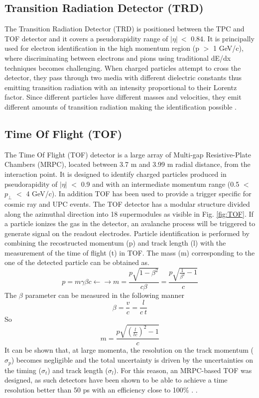 \documentclass[12pt,a4paper]{book}
\begin{document}
	
	\subsection{Transition Radiation Detector (TRD)}
	The Transition Radiation Detector (TRD) is positioned between the TPC and TOF detector and it covers a pseudorapidity range of $|\eta|\ <$ 0.84. It is principally used for electron identification in the high momentum region (p $>$ 1 GeV/c), where discriminating between electrons and pions using traditional dE/dx techniques becomes challenging. When charged particles attempt to cross the detector, they pass through two media with different dielectric constants thus emitting transition radiation with an intensity proportional to their Lorentz factor. Since different particles have different masses and velocities, they emit different amounts of transition radiation making the identification possible
	\cite{Padhan:2924203} \cite{amsdottorato9036}.
	
	
	\subsection{Time Of Flight (TOF)}
	The Time Of Flight (TOF) detector is a large array of Multi-gap Resistive-Plate Chambers (MRPC), located between 3.7 m and 3.99 m radial distance, from the interaction point. It is designed to identify charged particles produced in pseudorapidity of $|\eta|$ $<$ 0.9 and with an intermediate momentum range (0.5 $<$ $p_\perp$ $<$ 4 GeV/c). In addition TOF has been used to provide a trigger specific for cosmic ray and UPC events. The TOF detector has a modular structure divided along the azimuthal direction into 18 supermodules as visible in Fig. \ref{fig:TOF}. If a particle ionizes the gas in the detector, an avalanche process will be triggered to generate signal on the readout electrodes. Particle identification is performed by combining the recostructed momentum (p) and track length (l) with the measurement of the time of flight (t) in TOF. The mass (m) corresponding to the one of the detected particle can be obtained as. 
	\begin{equation}
		p = m \gamma \beta c \leftarrow \rightarrow m = \frac{p \sqrt{1- \beta^2}}{c \beta} = \frac{p \sqrt{\frac{1}{\beta^2}-1}}{c}
	\end{equation} 
	The $\beta$ parameter can be measured in the following manner
	\begin{equation}
		\beta = \frac{v}{c}=\frac{l}{c \ t}
	\end{equation}
	So 
	\begin{equation}
		m = \frac{p \sqrt{\left( \frac{l}{t c} \right)^2-1}}{c}
	\end{equation}
	It can be shown that, at large momenta, the resolution on the track momentum ($\sigma_p$) becomes negligible and the total uncertainty is driven by the uncertainties on the timing ($\sigma_t$) and track length ($\sigma_l$). For this reason, an MRPC-based TOF was designed, as such detectors have been shown to be able to achieve a time resolution better than 50 ps with an efficiency close to 100\% 
	\cite{Padhan:2924203} \cite{amsdottorato9036} \cite{Cheng:2908766}. .
	
\end{document}
